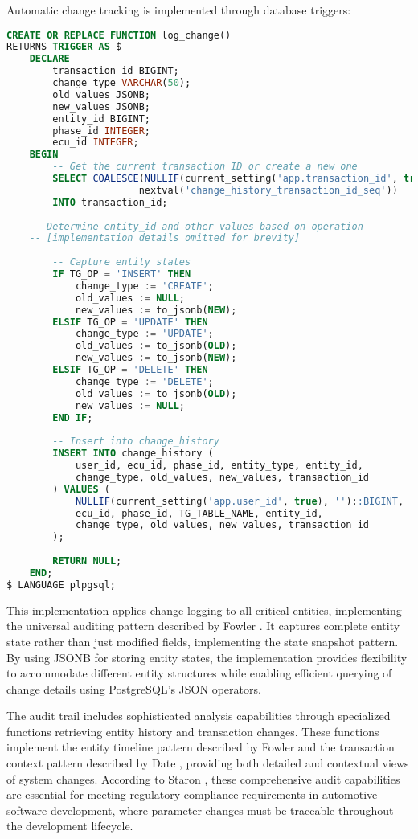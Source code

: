     Automatic change tracking is implemented through database triggers:
    
    \begin{lstlisting}[language=SQL, caption={Change History Trigger}, label={lst:change-history-trigger}]
    CREATE OR REPLACE FUNCTION log_change()
RETURNS TRIGGER AS $
    DECLARE
        transaction_id BIGINT;
        change_type VARCHAR(50);
        old_values JSONB;
        new_values JSONB;
        entity_id BIGINT;
        phase_id INTEGER;
        ecu_id INTEGER;
    BEGIN
        -- Get the current transaction ID or create a new one
        SELECT COALESCE(NULLIF(current_setting('app.transaction_id', true), ''),
                       nextval('change_history_transaction_id_seq')) 
        INTO transaction_id;
    
    -- Determine entity_id and other values based on operation
    -- [implementation details omitted for brevity]
        
        -- Capture entity states
        IF TG_OP = 'INSERT' THEN
            change_type := 'CREATE';
            old_values := NULL;
            new_values := to_jsonb(NEW);
        ELSIF TG_OP = 'UPDATE' THEN
            change_type := 'UPDATE';
            old_values := to_jsonb(OLD);
            new_values := to_jsonb(NEW);
        ELSIF TG_OP = 'DELETE' THEN
            change_type := 'DELETE';
            old_values := to_jsonb(OLD);
            new_values := NULL;
        END IF;
        
        -- Insert into change_history
        INSERT INTO change_history (
            user_id, ecu_id, phase_id, entity_type, entity_id,
            change_type, old_values, new_values, transaction_id
        ) VALUES (
            NULLIF(current_setting('app.user_id', true), '')::BIGINT,
            ecu_id, phase_id, TG_TABLE_NAME, entity_id,
            change_type, old_values, new_values, transaction_id
        );
        
        RETURN NULL;
    END;
$ LANGUAGE plpgsql;
    \end{lstlisting}
    
    This implementation applies change logging to all critical entities, implementing the universal auditing pattern described by Fowler \cite{fowler2003patterns}. It captures complete entity state rather than just modified fields, implementing the state snapshot pattern. By using JSONB for storing entity states, the implementation provides flexibility to accommodate different entity structures while enabling efficient querying of change details using PostgreSQL's JSON operators.
    
    The audit trail includes sophisticated analysis capabilities through specialized functions retrieving entity history and transaction changes. These functions implement the entity timeline pattern described by Fowler \cite{fowler2003patterns} and the transaction context pattern described by Date \cite{date2011sql}, providing both detailed and contextual views of system changes. According to Staron \cite{staron2021automotive}, these comprehensive audit capabilities are essential for meeting regulatory compliance requirements in automotive software development, where parameter changes must be traceable throughout the development lifecycle.
    